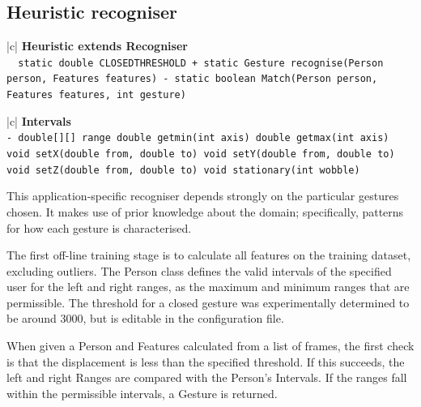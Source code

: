 \documentclass[12pt,a4,notitlepage]{report}
\renewcommand{\_}{\texttt{\symbol{95}}}
\newcommand{\<}{\texttt{\symbol{60}}}
\renewcommand{\>}{\texttt{\symbol{62}}}
\newcommand{\class}[1]{\textbf{#1}}
\newcommand{\variable}[1]{\texttt{#1}}
\begin{document}
\newpage

\subsection{Heuristic recogniser}

\begin{tabular}{|c|} \hline 
\class{Heuristic extends Recogniser} \\ \hline
{}
{\variable{\ \ static double CLOSED\_THRESHOLD \newline
 + static Gesture recognise(Person person, Features features) \newline
 - static boolean Match(Person person, Features features, int gesture)
} } \\ \hline
\end{tabular}

\begin{tabular}{|c|} \hline 
\class{Intervals} \\ \hline
{}
{\variable{- double[][] range \newline
  double get\_min(int axis) \newline
  double get\_max(int axis) \newline
  void setX(double from, double to) \newline
  void setY(double from, double to) \newline
  void setZ(double from, double to) \newline
  void stationary(int wobble)
} } \\ \hline
\end{tabular}

This application-specific recogniser depends strongly on the particular gestures chosen. It makes use of prior knowledge about the domain; specifically, patterns for how each gesture is characterised.

The first off-line training stage is to calculate all features on the training dataset, excluding outliers. The Person class defines the valid intervals of the specified user for the left and right ranges, as the maximum and minimum ranges that are permissible. The threshold for a closed gesture was experimentally determined to be around 3000, but is editable in the configuration file.

When given a Person and Features calculated from a list of frames, the first check is that the displacement is less than the specified threshold. If this succeeds, the left and right Ranges are compared with the Person's Intervals. If the ranges fall within the permissible intervals, a Gesture is returned.
\end{document}
